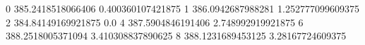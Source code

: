 0 385.2418518066406 0.400360107421875
1 386.0942687988281 1.252777099609375
2 384.84149169921875 0.0
4 387.5904846191406 2.748992919921875
6 388.2518005371094 3.410308837890625
8 388.1231689453125 3.28167724609375
